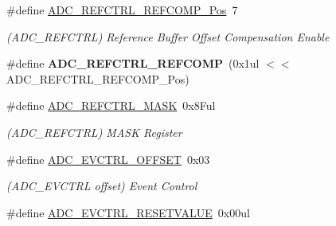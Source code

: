 \begin{DoxyCompactItemize}
\item 
\hypertarget{group___s_a_m_l21___a_d_c_gaecb97c00c286cfa030ba11dd4dc2d884}{}\#define \hyperlink{group___s_a_m_l21___a_d_c_gaecb97c00c286cfa030ba11dd4dc2d884}{A\+D\+C\+\_\+\+R\+E\+F\+C\+T\+R\+L\+\_\+\+R\+E\+F\+C\+O\+M\+P\+\_\+\+Pos}~7\label{group___s_a_m_l21___a_d_c_gaecb97c00c286cfa030ba11dd4dc2d884}

\begin{DoxyCompactList}\small\item\em (A\+D\+C\+\_\+\+R\+E\+F\+C\+T\+R\+L) Reference Buffer Offset Compensation Enable \end{DoxyCompactList}\item 
\hypertarget{group___s_a_m_l21___a_d_c_ga8d792ee4954ac03708bcb99ee68c2545}{}\#define {\bfseries A\+D\+C\+\_\+\+R\+E\+F\+C\+T\+R\+L\+\_\+\+R\+E\+F\+C\+O\+M\+P}~(0x1ul $<$$<$ A\+D\+C\+\_\+\+R\+E\+F\+C\+T\+R\+L\+\_\+\+R\+E\+F\+C\+O\+M\+P\+\_\+\+Pos)\label{group___s_a_m_l21___a_d_c_ga8d792ee4954ac03708bcb99ee68c2545}

\item 
\hypertarget{group___s_a_m_l21___a_d_c_ga19614f4a34b63887b140f3e276c41d11}{}\#define \hyperlink{group___s_a_m_l21___a_d_c_ga19614f4a34b63887b140f3e276c41d11}{A\+D\+C\+\_\+\+R\+E\+F\+C\+T\+R\+L\+\_\+\+M\+A\+S\+K}~0x8\+Ful\label{group___s_a_m_l21___a_d_c_ga19614f4a34b63887b140f3e276c41d11}

\begin{DoxyCompactList}\small\item\em (A\+D\+C\+\_\+\+R\+E\+F\+C\+T\+R\+L) M\+A\+S\+K Register \end{DoxyCompactList}\item 
\hypertarget{group___s_a_m_l21___a_d_c_gac21857646620ffdd08e5e8b06a428bcb}{}\#define \hyperlink{group___s_a_m_l21___a_d_c_gac21857646620ffdd08e5e8b06a428bcb}{A\+D\+C\+\_\+\+E\+V\+C\+T\+R\+L\+\_\+\+O\+F\+F\+S\+E\+T}~0x03\label{group___s_a_m_l21___a_d_c_gac21857646620ffdd08e5e8b06a428bcb}

\begin{DoxyCompactList}\small\item\em (A\+D\+C\+\_\+\+E\+V\+C\+T\+R\+L offset) Event Control \end{DoxyCompactList}\item 
\hypertarget{group___s_a_m_l21___a_d_c_gaeac5f216df63e8624c483526993c013c}{}\#define \hyperlink{group___s_a_m_l21___a_d_c_gaeac5f216df63e8624c483526993c013c}{A\+D\+C\+\_\+\+E\+V\+C\+T\+R\+L\+\_\+\+R\+E\+S\+E\+T\+V\+A\+L\+U\+E}~0x00ul\label{group___s_a_m_l21___a_d_c_gaeac5f216df63e8624c483526993c013c}


\end{DoxyCompactItemize}
